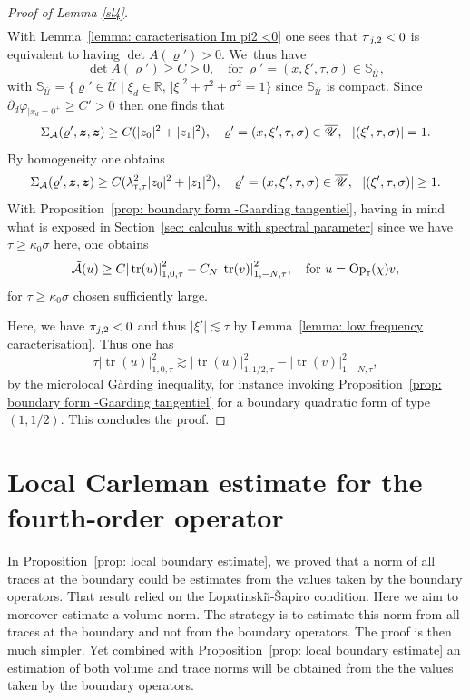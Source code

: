 \documentclass[JEP,XML,SOM,Unicode,published]{cedram}
\let\sep\mid
\theoremstyle{plain}
\theoremstyle{definition}
\def\R{\mathbb{R}}
\newcommand{\LS}{Lopatinski\u{\i}-\v{S}apiro\xspace}
\newcommand{\suff}{sufficiently\xspace}
\let\k\kappa
\let\y\varrho
\let \Re \relax
\DeclareMathOperator{\Re}{Re}
\let \Im \relax
\DeclareMathOperator{\Im}{Im}
\newcommand{\ovl}[1]{\overline{#1}}
\newcommand{\un}[1]{\Sigma_{#1}}
\newcommand{\U}{\mathscr U}
\newcommand{\z}{\boldsymbol{z}}
\newcommand{\br}{\ensuremath{_{|x_d=0^+}}}
\newcommand{\Opt}{\ensuremath{\mathrm{Op}_{\scriptscriptstyle{\mathsf{T}}}}}
\newcommand{\normsc}[2]{{| #1 |}_{#2, \tau}}
\newcommand{\lsct}{\lambda_{{\scriptscriptstyle{\mathsf T}},\tau}}
\DeclareMathOperator{\trace}{tr}
\begin{document}
\begin{proof}[ Proof of Lemma \ref{sl4}]
\begin{multline*}
\end{multline*}
With Lemma~\ref{lemma: caracterisation Im pi2 <0} one sees that $\Im \pi_{j,2}<0$
is equivalent to having $\det A (\y') > 0$.
We~thus have
\begin{equation*}
\det A (\y') \geq C>0,
\quad \text{for} \ \y' = (x,\xi',\tau,\sigma)\in
\mathbb{S}_{\ovl{\U}},
\end{equation*}
with $\mathbb{S}_{\ovl{\U}}=\{\y'\in
\ovl{\U}\sep \xi_d\in\R,\, |\xi|^2+\tau^2+\sigma^2=1\}$ since
$\mathbb{S}_{\ovl{\U}}$ is compact.
Since $\partial_d\varphi\br\geq C' >0$ then one finds that
\[
\Re \un{\mathcal A}(\y',\z,\z) \geq C (|z_0|^2 + |z_1|^2),\quad
\y' = (x,\xi',\tau,\sigma)\in\ovl{\U},
\ \ |(\xi',\tau,\sigma)|= 1.
\]
By homogeneity one obtains
\[
\Re \un{\mathcal A}(\y',\z,\z) \geq C (\lsct^2 |z_0|^2 + |z_1|^2),\quad
\y' = (x,\xi',\tau,\sigma)\in\ovl{\U},
\ \ |(\xi',\tau,\sigma)|\geq 1.
\]
With Proposition~\ref{prop: boundary form -Gaarding tangentiel}, having in mind what is exposed in
Section~\ref{sec: calculus with spectral parameter} since we have
$\tau \geq \k_0 \sigma$ here, one obtains
\begin{equation*}
\Re\mathcal{\tilde{A}}(u)
\geq C \normsc{\trace (u)}{1,0}^2
-C_N \normsc{\trace(v)}{1,-N}^2,
\quad \text{for}\ u = \Opt(\chi)v,
\end{equation*}
for $\tau\geq \k_0\sigma$ chosen \suff large.

Here, we have $\Im \pi_{j,2} <0$ and thus $|\xi'| \lesssim \tau$ by
Lemma~\ref{lemma: low frequency caracterisation}. Thus one has
\begin{equation*}
\tau \normsc{\trace (u)}{1,0}^2 \gtrsim \normsc{\trace (u)}{1,1/2}^2
- \normsc{\trace(v)}{1,-N}^2,
\end{equation*}
by the microlocal G{\aa}rding inequality, for instance invoking
Proposition~\ref{prop: boundary form -Gaarding tangentiel} for a boundary quadratic form of type $(1,1/2)$. This concludes the proof.
\end{proof}

\section{Local Carleman estimate for the fourth-order operator}
\label{sec: Local Carleman estimate for the fouth-order operator}

In Proposition~\ref{prop: local boundary estimate}, we proved that a
norm of all traces at the boundary could be estimates from the values
taken by the boundary operators. That result relied on the \LS
condition. Here we aim to moreover estimate a volume norm. The
strategy is to estimate this norm from all traces at the boundary and
not from the boundary operators. The proof is then much simpler. Yet
combined with Proposition~\ref{prop: local boundary estimate} an
estimation of both volume and trace norms will be obtained from the
the values taken by the boundary operators.
\end{document}
